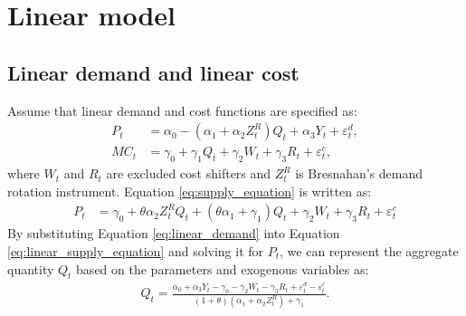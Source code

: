 \documentclass[11pt, a4paper]{article}
\begin{document}

\section{Linear model}

\subsection{Linear demand and linear cost}
Assume that linear demand and cost functions are specified as:
\begin{align}
    P_t &= \alpha_0 - (\alpha_1 + \alpha_2Z^{R}_{t})Q_{t} + \alpha_3 Y_t + \varepsilon^{d}_{t},\label{eq:linear_demand}\\
    MC_t &= \gamma_0  + \gamma_1 Q_{t} + \gamma_2 W_{t} + \gamma_3 R_{t} + \varepsilon^{c}_{t},\label{eq:linear_marginal_cost}
\end{align}
where $W_{t}$ and $R_{t}$ are excluded cost shifters and $Z^{R}_{t}$ is Bresnahan's demand rotation instrument. 
Equation \eqref{eq:supply_equation} is written as:
\begin{align}
    P_t 
    &= \gamma_0 + \theta \alpha_2 Z^{R}_tQ_{t} + (\theta\alpha_1 + \gamma_1) Q_{t} + \gamma_2 W_t + \gamma_3 R_{t} +\varepsilon^c_t\label{eq:linear_supply_equation}
\end{align}
By substituting Equation \eqref{eq:linear_demand} into Equation \eqref{eq:linear_supply_equation} and solving it for $P_t$, we can represent the aggregate quantity $Q_{t}$ based on the parameters and exogenous variables as:
\begin{align}
    Q_{t} =  \frac{\alpha_0 + \alpha_3 Y_t - \gamma_0 - \gamma_2 W_{t} - \gamma_3 R_{t} + \varepsilon^{d}_{t} - \varepsilon^{c}_{t}}{(1 + \theta) (\alpha_1 + \alpha_2 Z^{R}_{t}) + \gamma_1}.\label{eq:quantity_linear}
\end{align}
\end{document}
